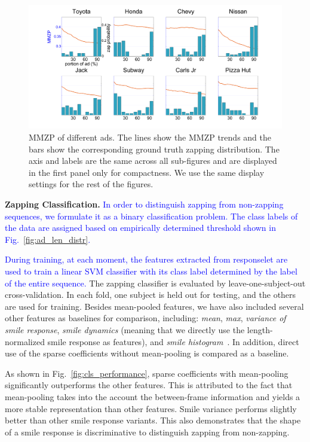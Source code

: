 \documentclass[twoside,leqno,twocolumn]{article}
\newcommand{\SFAdd}[1]{\textcolor{blue}{#1}}
\begin{document}
\begin{figure}[t]
	\centering
		\includegraphics[width=.8\textwidth]{fig/ad.png}
	\caption{MMZP of different ads. The lines show the MMZP trends and the bars show the corresponding ground truth zapping distribution. The axis and labels are the same across all sub-figures and are displayed in the first panel only for compactness. We use the same display settings for the rest of the figures.}
	\label{fig:ad}
\end{figure}

\noindent \textbf{Zapping Classification.}
\SFAdd{In order to distinguish zapping from non-zapping sequences, we formulate it as a binary classification problem. The class labels of the data are assigned based on empirically determined threshold shown in Fig.~\ref{fig:ad_len_distr}.}

\SFAdd{During training, at each moment, the features extracted from responselet are used to train a linear SVM classifier with its class label determined by the label of the entire sequence.} The zapping classifier is evaluated by leave-one-subject-out cross-validation. In each fold, one subject is held out for testing, and the others are used for training. Besides mean-pooled features, we have also included several other features as baselines for comparison, including: \textit{mean}, \textit{max}, \textit{variance of smile response}, \textit{smile dynamics} (meaning that we directly use the length-normalized smile response as features), and \textit{smile histogram}~\cite{Yang_TAC14}. In addition, direct use of the sparse coefficients without mean-pooling is compared as a baseline. 

As shown in Fig.~\ref{fig:cls_performance}, sparse coefficients with mean-pooling significantly outperforms the other features. This is attributed to the fact that mean-pooling takes into the account the between-frame information and yields a more stable representation than other features. Smile variance performs slightly better than other smile response variants. This also demonstrates that the shape of a smile response is discriminative to distinguish zapping from non-zapping. 
\end{document}
